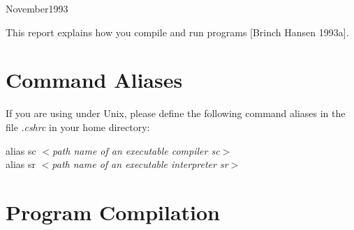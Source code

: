   {\begin{small}
     }
  {\end{small}}
\newenvironment{mytabular}[1]
  {\begin{small}
     \begin{center}
       \begin{tabular}{#1}}
  {    \end{tabular}
     \end{center}
   \end{small}}
\newenvironment{program}[1]
  {\begin{center}
     \begin{minipage}{#1}}
  {  \end{minipage}
   \end{center}}
\newcommand{\PA}
  {\noindent}
\newcommand{\PB}
  {\mbox{\hspace{1em}}}
\newcommand{\PC}
  {\mbox{\hspace{2em}}}
\newcommand{\PD}
  {\mbox{\hspace{3em}}}
\newcommand{\PE}
  {\mbox{\hspace{4em}}}



  {November}{1993}

\begin{myabstract}
  This report explains how you compile and run {\Superpascal}
  programs [Brinch Hansen 1993a].
\end{myabstract}


\section{Command Aliases}

If you are using {\Superpascal} under Unix, please define the
following command aliases in the file .{\it cshrc} in your
home directory:

\begin{program}{23.5em}
  {\PA}alias sc $<${\it path name of an executable compiler sc}$>$   \\
  {\PA}alias sr $<${\it path name of an executable interpreter sr}$>$\\
\end{program}


\section{Program Compilation}

